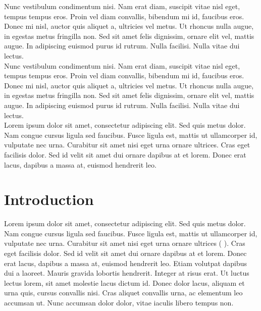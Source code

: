 \documentclass[10pt,a4paper]{article}
\begin{document}
Nunc vestibulum condimentum nisi. Nam erat diam, suscipit vitae nisl eget, tempus tempus eros. Proin vel diam convallis, bibendum mi id, faucibus eros. Donec mi nisl, auctor quis aliquet a, ultricies vel metus. Ut rhoncus nulla augue, in egestas metus fringilla non. Sed sit amet felis dignissim, ornare elit vel, mattis augue. In adipiscing euismod purus id rutrum. Nulla facilisi. Nulla vitae dui lectus.
~\\
Nunc vestibulum condimentum nisi. Nam erat diam, suscipit vitae nisl eget, tempus tempus eros. Proin vel diam convallis, bibendum mi id, faucibus eros. Donec mi nisl, auctor quis aliquet a, ultricies vel metus. Ut rhoncus nulla augue, in egestas metus fringilla non. Sed sit amet felis dignissim, ornare elit vel, mattis augue. In adipiscing euismod purus id rutrum. Nulla facilisi. Nulla vitae dui lectus.
~\\
Lorem ipsum dolor sit amet, consectetur adipiscing elit. Sed quis metus dolor. Nam congue cursus ligula sed faucibus. Fusce ligula est, mattis ut ullamcorper id, vulputate nec urna. Curabitur sit amet nisi eget urna ornare ultrices. Cras eget facilisis dolor. Sed id velit sit amet dui ornare dapibus at et lorem. Donec erat lacus, dapibus a massa at, euismod hendrerit leo.

\newpage


\section{Introduction} 
\label{sec.Introduction}
%
Lorem ipsum dolor sit amet, consectetur adipiscing elit. Sed quis metus dolor. Nam congue cursus ligula sed faucibus. Fusce ligula est, mattis ut ullamcorper id, vulputate nec urna. Curabitur sit amet nisi eget urna ornare ultrices ( ). Cras eget facilisis dolor. Sed id velit sit amet dui ornare dapibus at et lorem. Donec erat lacus, dapibus a massa at, euismod hendrerit leo. Etiam volutpat dapibus dui a laoreet. Mauris gravida lobortis hendrerit. Integer at risus erat. Ut luctus lectus lorem, sit amet molestie lacus dictum id. Donec dolor lacus, aliquam et urna quis, cursus convallis nisi. Cras aliquet convallis urna, ac elementum leo accumsan ut. Nunc accumsan dolor dolor, vitae iaculis libero tempus non.

\newpage

\end{document}
